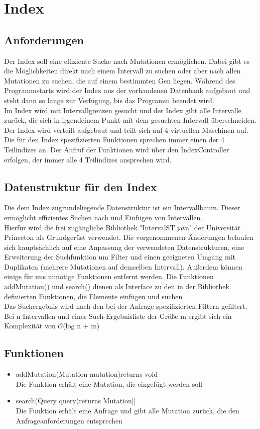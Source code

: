 \documentclass[]{article}
\begin{document}
\newpage
\section{Index}
\subsection{Anforderungen}
Der Index soll eine effiziente Suche nach Mutationen ermöglichen. Dabei gibt es die Möglichkeiten direkt nach einem Intervall zu suchen oder aber nach allen Mutationen zu suchen, die auf einem bestimmten Gen liegen. Während des Programmstarts wird der Index aus der vorhandenen Datenbank aufgebaut und steht dann so lange zur Verfügung, bis das Programm beendet wird.\\
Im Index wird mit Intervallgrenzen gesucht und der Index gibt alle Intervalle zurück, die sich in irgendeinem Punkt mit dem gesuchten Intervall überschneiden.\\
Der Index wird verteilt aufgebaut und teilt sich auf 4 virtuellen Maschinen auf. Die für den Index spezifizierten Funktionen sprechen immer einen der 4 Teilindizes an. Der Aufruf der Funktionen wird über den IndexController erfolgen, der immer alle 4 Teilindizes ansprechen wird.

\subsection{Datenstruktur für den Index}
Die dem Index zugrundeliegende Datenstruktur ist ein Intervallbaum. Dieser ermöglicht effizientes Suchen nach und Einfügen von Intervallen.\\
Hierfür wird die frei zugängliche Bibliothek "IntervalST.java" der Universität Princeton als Grundgerüst verwendet. Die vorgenommenen Änderungen belaufen sich hauptsächlich auf eine Anpassung der verwendeten Datenstrukturen, eine Erweiterung der Suchfunktion um Filter und einen geeigneten Umgang mit Duplikaten (mehrere Mutationen auf demselben Intervall). Außerdem können einige für uns unnötige Funktionen entfernt werden. Die Funktionen addMutation() und search() dienen als Interface zu den in der Bibliothek definierten Funktionen, die Elemente einfügen und suchen\\
Das Suchergebnis wird nach den bei der Anfrage spezifizierten Filtern gefiltert. Bei n Intervallen und einer Such-Ergebnisliste der Größe m ergibt sich ein Komplexität von $\mathcal{O}$(log n + m)\\
\subsection{Funktionen}
\begin{itemize}
\item addMutation(Mutation mutation)returns void\\
Die Funktion erhält eine Mutation, die eingefügt werden soll
\item search(Query query)returns Mutation[]\\
Die Funktion erhält eine Anfrage und gibt alle Mutation zurück, die den Anfrageanforderungen entsprechen
\end{itemize}
\newpage
\end{document}
